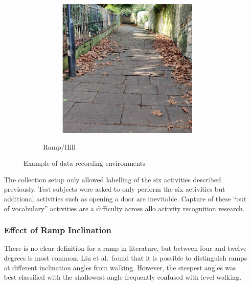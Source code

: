 \begin{figure}[p]
\begin{subfigure}[b]{\textwidth}
\begin{subfigure}[b]{0.32\textwidth}
        \end{subfigure}
        \hfill
        \begin{subfigure}[b]{0.32\textwidth}
            \centering
            \includegraphics[width=\textwidth]{content/3-Methods/enviroments/ramp_3_modified.jpg}
        \end{subfigure}
        \caption{Ramp/Hill}
        \label{fig:methods-ramp-example}
    \end{subfigure}
    \caption{Example of data recording environments}
    \label{fig:methods-example-enviroments}
\end{figure}


The collection setup only allowed labelling of the six activities described previously. Test subjects were asked to only perform the six activities but additional activities such as opening a door are inevitable. Capture of these ``out of vocabulary'' activities are a difficulty across allo activity recognition research\cite{Cook2013a}.

\subsubsection{Effect of Ramp Inclination}
There is no clear definition for a ramp in literature, but between four and twelve degrees is most common\cite{Godiyal2018a, Lu2020, Liu2021, Su2021}. Liu et al.~found that it is possible to distinguish ramps at different inclination angles from walking. However, the steepest angles was best classified with the shallowest angle frequently confused with level walking.\cite{Liu2021}

